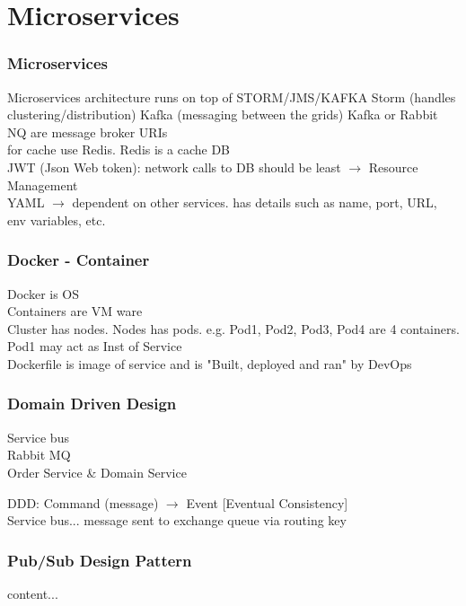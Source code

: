 \documentclass{beamer}
\begin{document}



\section{Microservices}

\begin{frame}
	\frametitle{Microservices}
	Microservices architecture runs on top of STORM/JMS/KAFKA \newline
	Storm (handles clustering/distribution) \newline
	Kafka (messaging between the grids) \newline
	Kafka or Rabbit NQ are message broker URIs\\
	for cache use Redis. Redis is a cache DB\\
	JWT (Json Web token): network calls to DB should be least $\rightarrow$ Resource Management\\
	YAML $\rightarrow$ dependent on other services. has details such as name, port, URL, env variables, etc.
\end{frame}


\begin{frame}\frametitle{Docker - Container}
	Docker is OS\\
	Containers are VM ware\\
	Cluster has nodes. Nodes has pods. e.g. Pod1, Pod2, Pod3, Pod4 are 4 containers. Pod1 may act as Inst of Service\\
	Dockerfile is image of service and is "Built, deployed and ran" by DevOps\\
\end{frame}

\begin{frame}\frametitle{Domain Driven Design}
	Service bus\\
	Rabbit MQ\\
	Order Service \& Domain Service

	DDD: Command (message) $\rightarrow$ Event [Eventual Consistency]\\
	
	Service bus... message sent to exchange queue via routing key
\end{frame}

\begin{frame}\frametitle{Pub/Sub Design Pattern}
content...
\end{frame}
\end{document}
